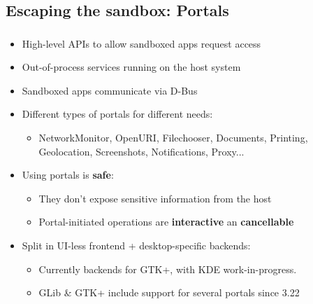 \subsection{Escaping the sandbox: Portals}
\begin{frame}
  \frametitle{\insertsubsection}

  \begin{itemize}
  \item High-level APIs to allow sandboxed apps request access\vspacing
  \item Out-of-process services running on the host system\vspacing
  \item Sandboxed apps communicate via D-Bus\vspacing
  \item Different types of portals for different needs:
    \begin{itemize}
    \item NetworkMonitor, OpenURI, Filechooser, Documents, Printing, Geolocation, Screenshots, Notifications, Proxy...\vspacing
    \end{itemize}

  \item Using portals is \textbf{safe}:
    \begin{itemize}
    \item They don't expose sensitive information from the host\vspacing
    \item Portal-initiated operations are \textbf{interactive} an \textbf{cancellable}\vspacing
    \end{itemize}

  \item Split in UI-less frontend + desktop-specific backends:
    \begin{itemize}
    \item Currently backends for GTK+, with KDE work-in-progress.\vspacing
    \item GLib \& GTK+ include support for several portals since 3.22
    \end{itemize}
  \end{itemize}

\end{frame}

